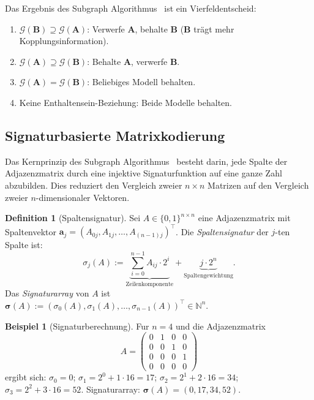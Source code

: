 \documentclass[a4paper, 12pt, twoside, openright]{report}
\theoremstyle{definition}
\newtheorem{definition}[theorem]{Definition}
\newtheorem{example}[theorem]{Beispiel}
\theoremstyle{definition}
\newcommand{\vA}{\bm{A}}
\newcommand{\vB}{\bm{B}}
\newcommand{\T}{\top}
\begin{document}
Das Ergebnis des Subgraph Algorithmus~\citep{epp2026subgraph} ist ein
Vierfeldentscheid:
\begin{enumerate}[label=(\roman*)]
  \item $\mathcal{G}(\vB) \supseteq \mathcal{G}(\vA)$: Verwerfe $\vA$, behalte $\vB$
    ($\vB$ trägt mehr Kopplungsinformation).
  \item $\mathcal{G}(\vA) \supseteq \mathcal{G}(\vB)$: Behalte $\vA$, verwerfe $\vB$.
  \item $\mathcal{G}(\vA) = \mathcal{G}(\vB)$: Beliebiges Modell behalten.
  \item Keine Enthaltensein-Beziehung: Beide Modelle behalten.
\end{enumerate}

\subsection{Signaturbasierte Matrixkodierung}

Das Kernprinzip des Subgraph Algorithmus~\citep{epp2026subgraph} besteht darin, jede
Spalte der Adjazenzmatrix durch eine injektive Signaturfunktion auf eine ganze Zahl
abzubilden. Dies reduziert den Vergleich zweier $n \times n$ Matrizen auf den Vergleich
zweier $n$-dimensionaler Vektoren.

\begin{definition}[Spaltensignatur]
\label{def:signatur}
Sei $A \in \{0,1\}^{n \times n}$ eine Adjazenzmatrix mit Spaltenvektor
$\bm{a}_j = (A_{0j}, A_{1j}, \ldots, A_{(n-1)j})^\T$.
Die \emph{Spaltensignatur} der $j$-ten Spalte ist:
\begin{equation}
  \sigma_j(A) :=
    \underbrace{\sum_{i=0}^{n-1} A_{ij} \cdot 2^i}_{\text{Zeilenkomponente}}
    + \underbrace{j \cdot 2^n}_{\text{Spaltengewichtung}}.
  \label{eq:signatur}
\end{equation}
Das \emph{Signaturarray} von $A$ ist
$\bm{\sigma}(A) := (\sigma_0(A), \sigma_1(A), \ldots, \sigma_{n-1}(A))^\T \in \mathbb{N}^n$.
\end{definition}

\begin{example}[Signaturberechnung]
\label{bsp:signatur}
Fur $n = 4$ und die Adjazenzmatrix
\[
  A = \begin{pmatrix}
    0 & 1 & 0 & 0 \\
    0 & 0 & 1 & 0 \\
    0 & 0 & 0 & 1 \\
    0 & 0 & 0 & 0
  \end{pmatrix}
\]
ergibt sich: $\sigma_0 = 0$; $\sigma_1 = 2^0 + 1 \cdot 16 = 17$;
$\sigma_2 = 2^1 + 2 \cdot 16 = 34$; $\sigma_3 = 2^2 + 3 \cdot 16 = 52$.
Signaturarray: $\bm{\sigma}(A) = (0, 17, 34, 52)$.
\end{example}
\end{document}
